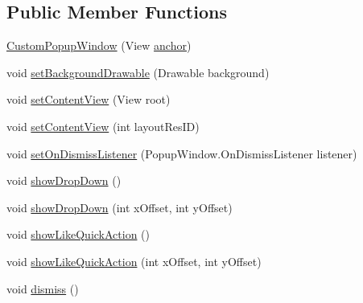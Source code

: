 \subsection*{Public Member Functions}
\begin{DoxyCompactItemize}
\item 
\hyperlink{classcom_1_1zia_1_1freshdocs_1_1widget_1_1quickaction_1_1_custom_popup_window_a474009e339c8cb6d93892af745692573}{Custom\-Popup\-Window} (View \hyperlink{classcom_1_1zia_1_1freshdocs_1_1widget_1_1quickaction_1_1_custom_popup_window_a2ddc37724854869179d0c674580dce1b}{anchor})
\item 
void \hyperlink{classcom_1_1zia_1_1freshdocs_1_1widget_1_1quickaction_1_1_custom_popup_window_ab9c110db636039cb64da16c8812f825f}{set\-Background\-Drawable} (Drawable background)
\item 
void \hyperlink{classcom_1_1zia_1_1freshdocs_1_1widget_1_1quickaction_1_1_custom_popup_window_a1dc8877a671b9be54ad6437a72c30373}{set\-Content\-View} (View root)
\item 
void \hyperlink{classcom_1_1zia_1_1freshdocs_1_1widget_1_1quickaction_1_1_custom_popup_window_a5a857ff064306c84e03f7ee77301bea4}{set\-Content\-View} (int layout\-Res\-I\-D)
\item 
void \hyperlink{classcom_1_1zia_1_1freshdocs_1_1widget_1_1quickaction_1_1_custom_popup_window_a4338d9d7c421a3449339391adfa421c9}{set\-On\-Dismiss\-Listener} (Popup\-Window.\-On\-Dismiss\-Listener listener)
\item 
void \hyperlink{classcom_1_1zia_1_1freshdocs_1_1widget_1_1quickaction_1_1_custom_popup_window_ab19080f7ea8fb699347e9b10d09bd380}{show\-Drop\-Down} ()
\item 
void \hyperlink{classcom_1_1zia_1_1freshdocs_1_1widget_1_1quickaction_1_1_custom_popup_window_ab357f0fb3f54bd284c113320ea7bd68e}{show\-Drop\-Down} (int x\-Offset, int y\-Offset)
\item 
void \hyperlink{classcom_1_1zia_1_1freshdocs_1_1widget_1_1quickaction_1_1_custom_popup_window_a354b4de6dd6f3260a659ac85608bd9ab}{show\-Like\-Quick\-Action} ()
\item 
void \hyperlink{classcom_1_1zia_1_1freshdocs_1_1widget_1_1quickaction_1_1_custom_popup_window_adacd789199f4258c356a3369c3faa495}{show\-Like\-Quick\-Action} (int x\-Offset, int y\-Offset)
\item 
void \hyperlink{classcom_1_1zia_1_1freshdocs_1_1widget_1_1quickaction_1_1_custom_popup_window_abacc154f02bf8a0823a8ec8ae1d56aca}{dismiss} ()
\end{DoxyCompactItemize}
